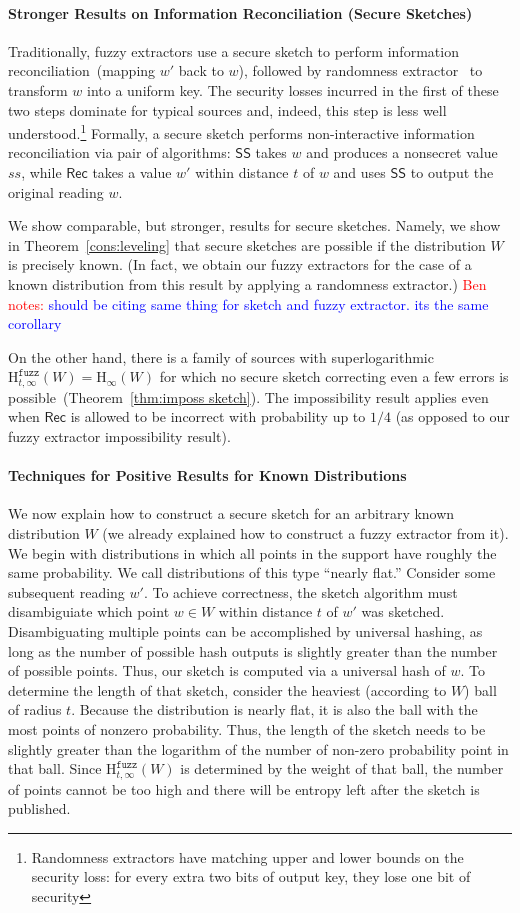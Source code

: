 \documentclass[11pt]{article}
\newcommand{\thref}[1]{\mbox{Theorem~\ref{#1}}}
\newcommand{\class}[1]{{\ensuremath{\mathsf{#1}}}}
\newcommand{\sketch}{\ensuremath{\class{SS}}\xspace}
\newcommand{\rec}{\ensuremath{\class{Rec}}\xspace}
\newcommand{\Hoo}{\mathrm{H}_\infty}
\newcommand{\Hfuzz}{\mathrm{H}^{\mathtt{fuzz}}_{t,\infty}}
\newcommand{\authnote}[2]{{\textcolor{red}{\textsf{#1 notes: }\textcolor{blue}{ #2}}\marginpar{\textcolor{red}{\textbf{!!!!!}}}}}
\newcommand{\authnote}[2]{}
\newcommand{\bnote}[1]{{\authnote{Ben}{#1}}}
\begin{document}
\paragraph{Stronger Results on Information Reconciliation (Secure Sketches)}
Traditionally, fuzzy extractors use a secure sketch to perform information reconciliation~(mapping $w'$ back to $w$), followed by randomness extractor~\cite{nisan1993randomness} to transform $w$ into a uniform key.  The security losses incurred in the first of these two steps dominate for typical sources and, indeed, this step is less well understood.\footnote{Randomness extractors have matching upper and lower bounds on the security loss: for every extra two bits of output key, they lose one bit of security} Formally, a secure sketch performs non-interactive information reconciliation via pair of algorithms: $\sketch$ takes $w$ and produces a nonsecret value $ss$, while $\rec$ takes a value $w'$ within distance $t$ of $w$ and uses $\sketch$ to output the original reading $w$.  

We show comparable, but stronger, results for secure sketches.  Namely, we show in \thref{cons:leveling} that secure sketches are possible if the distribution $W$ is precisely known. (In fact, we obtain our fuzzy extractors for the case of a known distribution from this result by applying a randomness extractor.) \bnote{should be citing same thing for sketch and fuzzy extractor.  its the same corollary} 

On the other hand, there is a family of sources with superlogarithmic $\Hfuzz(W)=\Hoo(W)$ for which no secure sketch correcting even a few errors is possible~(\thref{thm:imposs sketch}). The impossibility result applies even when $\rec$ is allowed to be incorrect with probability up to $1/4$ (as opposed to our fuzzy extractor impossibility result).


\paragraph{Techniques for Positive Results for Known Distributions} We now explain how to construct a secure sketch for an arbitrary known distribution $W$ (we already explained how to construct a fuzzy extractor from it).  We begin with distributions in which all points in the support have roughly the same probability.  We call distributions of this type ``nearly flat.''  Consider some subsequent reading $w'$. To achieve correctness, the sketch algorithm must disambiguiate which point $w\in W$ within distance $t$ of $w'$ was sketched. Disambiguating multiple points can be accomplished by universal hashing, as long as the number of possible hash outputs is slightly greater than the number of possible points. Thus, our sketch is computed via a universal hash of $w$. To determine the length of that sketch, consider the heaviest (according to $W$) ball of radius $t$. Because the distribution is nearly flat, it is also the ball with the most points of nonzero probability. Thus, the length of the sketch needs to be slightly greater than the logarithm of the number of non-zero probability point in that ball. Since $\Hfuzz(W)$ is determined by the weight of that ball, the number of points cannot be too high and there will be entropy left after the sketch is published.
\end{document}
